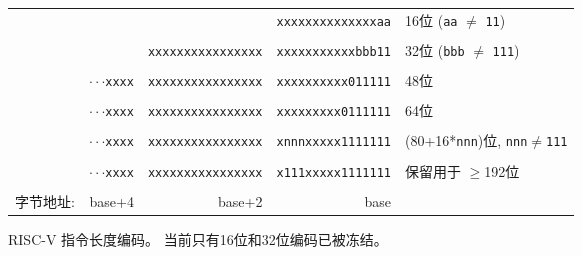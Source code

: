 \begin{figure}[hbt]
{
\begin{center}
\begin{tabular}{ccccl}
\cline{4-4}
& & & \multicolumn{1}{|c|}{\tt xxxxxxxxxxxxxxaa} & 16位 ({\tt aa}
$\neq$ {\tt 11})\\
\cline{4-4}
\\
\cline{3-4}
& & \multicolumn{1}{|c|}{\tt xxxxxxxxxxxxxxxx}
& \multicolumn{1}{c|}{\tt xxxxxxxxxxxbbb11} & 32位 ({\tt bbb}
$\neq$ {\tt 111}) \\
\cline{3-4}
\\
\cline{2-4}
\hspace{0.1in} 
& \multicolumn{1}{c|}{$\cdot\cdot\cdot${\tt xxxx} }
& \multicolumn{1}{c|}{\tt xxxxxxxxxxxxxxxx}
& \multicolumn{1}{c|}{\tt xxxxxxxxxx011111} & 48位 \\
\cline{2-4}
\\
\cline{2-4}
\hspace{0.1in} 
& \multicolumn{1}{c|}{$\cdot\cdot\cdot${\tt xxxx} }
& \multicolumn{1}{c|}{\tt xxxxxxxxxxxxxxxx}
& \multicolumn{1}{c|}{\tt xxxxxxxxx0111111} & 64位 \\
\cline{2-4}
\\
\cline{2-4}
\hspace{0.1in} 
& \multicolumn{1}{c|}{$\cdot\cdot\cdot${\tt xxxx} }
& \multicolumn{1}{c|}{\tt xxxxxxxxxxxxxxxx}
& \multicolumn{1}{c|}{\tt xnnnxxxxx1111111} & (80+16*{\tt nnn})位,
       {\tt nnn}$\neq${\tt 111} \\
\cline{2-4}
\\
\cline{2-4}
\hspace{0.1in} 
& \multicolumn{1}{c|}{$\cdot\cdot\cdot${\tt xxxx} }
& \multicolumn{1}{c|}{\tt xxxxxxxxxxxxxxxx}
& \multicolumn{1}{c|}{\tt x111xxxxx1111111} & 保留用于 $\geq$192位 \\
\cline{2-4}
\\
字节地址: & \multicolumn{1}{r}{base+4} & \multicolumn{1}{r}{base+2} & \multicolumn{1}{r}{base} & \\
 \end{tabular}
\end{center}
}
\caption{RISC-V 指令长度编码。 当前只有16位和32位编码已被冻结。}
\label{instlengthcode}
\end{figure}

